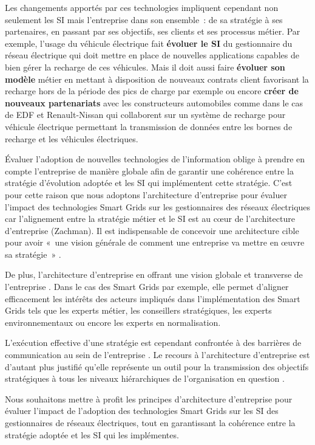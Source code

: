 Les changements apportés par ces technologies impliquent cependant non seulement les SI mais l'entreprise dans son ensemble~: de sa stratégie à ses partenaires, en passant par ses objectifs, ses clients et ses processus métier. Par exemple, l'usage du véhicule électrique fait \textbf{évoluer le SI} du gestionnaire du réseau électrique qui doit mettre en place de nouvelles applications capables de bien gérer la recharge de ces véhicules. Mais il doit aussi faire \textbf{évoluer son modèle} métier en mettant à disposition de nouveaux contrats client favorisant la recharge hors de la période des pics de charge par exemple ou encore \textbf{créer de nouveaux partenariats} avec les constructeurs automobiles comme dans le cas de EDF et Renault-Nissan qui collaborent sur un système de recharge pour véhicule électrique permettant la transmission de données entre les bornes de recharge et les véhicules électriques.

Évaluer l'adoption de nouvelles technologies de l'information oblige à prendre en compte l'entreprise de manière globale afin de garantir une cohérence entre la stratégie d'évolution adoptée et les SI qui implémentent cette stratégie. C'est pour cette raison que nous adoptons l'architecture d'entreprise pour évaluer l'impact des technologies Smart Grids sur les gestionnaires des réseaux électriques car l'alignement entre la stratégie métier et le SI est au cœur de l'architecture d'entreprise (Zachman). Il est indispensable de concevoir une architecture cible pour avoir  «~une vision générale de comment une entreprise va mettre en œuvre sa stratégie~» \cite{ross2006enterprise}.

De plus, l'architecture d'entreprise en offrant une vision globale et transverse de l'entreprise \cite{zachman1987framework}. Dans le cas des Smart Grids par exemple, elle permet d'aligner efficacement les intérêts des acteurs impliqués dans l'implémentation des Smart Grids tels que les experts métier, les conseillers stratégiques, les experts environnementaux ou encore les experts en normalisation.

L'exécution effective d'une stratégie est cependant confrontée à des barrières de communication au sein de l'entreprise \cite{vcater2010factors}. Le recours à l'architecture d'entreprise est d'autant plus justifié qu'elle représente un outil pour la transmission des objectifs stratégiques à tous les niveaux hiérarchiques de l'organisation en question \cite{kappelman2008enterprise}. 

Nous souhaitons mettre à profit les principes d'architecture d'entreprise pour évaluer l'impact de l'adoption des technologies Smart Grids sur les SI des gestionnaires de réseaux électriques, tout en garantissant la cohérence entre la stratégie adoptée et les SI qui les implémentes. 



